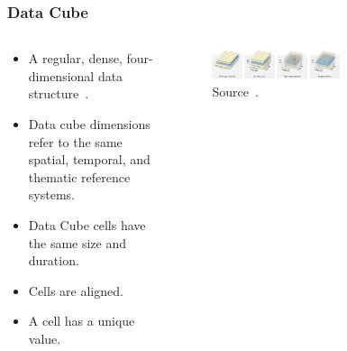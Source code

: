 \documentclass[aspectratio=169]{beamer}
\begin{document}
\begin{frame}
    \frametitle{Data Cube}
    \begin{columns}
        \begin{column}{0.5\textwidth}
            \begin{itemize}
                \item A regular, dense, four-dimensional data 
                    structure~\cite{appel2019}.
                \item Data cube dimensions refer to the same spatial, temporal, 
                    and thematic reference systems.
                \item Data Cube cells have the same size and duration.
                \item Cells are aligned.
                \item A cell has a unique value.
            \end{itemize}
        \end{column}
    \end{columns}
\end{frame}
\end{document}
